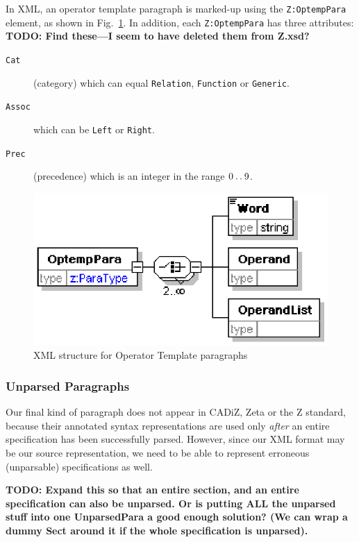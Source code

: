 \documentclass{llncs}  %
\newcommand{\AFont}[1]{\texttt{#1}}
\newcommand{\CADiZ}{CADiZ}
\newcommand{\Zeta}{Zeta}
\newcommand{\TODO}[1]{\textbf{TODO: #1}}   %
\begin{document}
In XML, an operator template paragraph is marked-up using
the \AFont{Z:OptempPara} element, as shown in Fig.~\ref{fig:optemppara}.
In addition, each \AFont{Z:OptempPara} has three attributes:
\TODO{Find these---I seem to have deleted them from Z.xsd?}
\begin{description}
\item[\AFont{Cat}] (category) which can equal \AFont{Relation},
  \AFont{Function} or \AFont{Generic}.  
\item[\AFont{Assoc}] which can be \AFont{Left} or \AFont{Right}. 
\item[\AFont{Prec}] (precedence) which is an integer in the range $0 \mathbin{\mathstrut{\ldotp\ldotp}}
  9$.
\end{description}

\begin{figure}[htbp]
  \centering
  \includegraphics{optemppara.eps}
  \caption{XML structure for Operator Template paragraphs}
  \label{fig:optemppara}
\end{figure}


\subsubsection{Unparsed Paragraphs}

Our final kind of paragraph does not appear in \CADiZ, {\Zeta}
or the Z standard, because their annotated syntax representations
are used only \emph{after} an entire specification has been successfully
parsed.  However, since our XML format may be our source representation,
we need to be able to represent erroneous (unparsable) specifications as
well. 

\TODO{Expand this so that an entire section, and an entire specification
  can also be unparsed.  Or is putting ALL the unparsed stuff into one
  UnparsedPara a good enough solution?  (We can wrap a dummy Sect around it
  if the whole specification is unparsed).}
\end{document}
